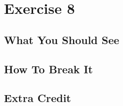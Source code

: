 \chapter{Exercise 8}


\section{What You Should See}


\section{How To Break It}


\section{Extra Credit}



